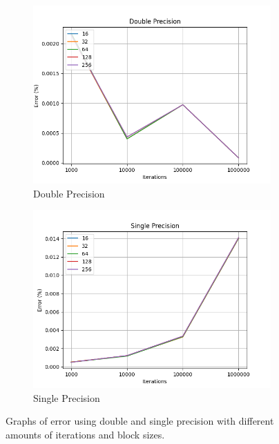 \documentclass[a4paper, 12pt]{article}
\begin{document}
\begin{figure}
  \centering
  \begin{subfigure}{.5\textwidth}
    \centering
    \includegraphics[width=1\linewidth]{graphs/ex_bonus_double_error.png}
    \caption{Double Precision}
    \label{fig:ex-single-double-error}
  \end{subfigure}%
  \begin{subfigure}{.5\textwidth}
    \centering
    \includegraphics[width=1\linewidth]{graphs/ex_bonus_single_error.png}
    \caption{Single Precision}
    \label{fig:ex-bonus-single-error}
  \end{subfigure}
  \caption{Graphs of error using double and single precision with different amounts of iterations and block sizes.}
  \label{fig:fig:ex-bonus-error}
\end{figure}
\end{document}
